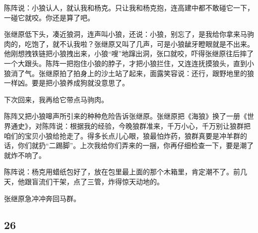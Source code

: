 \par 陈阵说：小狼认人，就认我和杨克。只让我和杨克抱，连高建中都不敢碰它一下，一碰它就咬。你还是算了吧。
\par 张继原低下头，凑近狼洞，连声叫小狼，还说：小狼，别忘了，是我给你拿来马驹肉的，吃饱了，就不认我啦？张继原又叫了几声，可是小狼龇牙瞪眼就是不出来。他刚想拽铁链把小狼拽出来，小狼“嗖”地蹿出洞，张口就咬，吓得张继原往后摔了一个大跟头。陈阵一把抱住小狼的脖子，才把小狼拦住，又连连抚摸狼头，直到小狼消了气。张继原拍了拍身上的沙土站了起来，面露笑容说：还行，跟野地里的狼一样凶。要是把小狼养成狗就没意思了。
\par 下次回来，我再给它带点马驹肉。
\par 陈阵又把小狼嗥声所引来的种种危险告诉张继原。张继原把《海狼》换了一册《世界通史》，对陈阵说：根据我的经验，今晚狼群准来，千万小心，千万别让狼群把咱们的宝贝小狼给抢走了。得多长点儿心眼，狼最怕炸药，狼群真要是冲羊群的话，你们就扔“二踢脚”。上次我给你们弄来的一捆，你再仔细检查一下，要是潮了就炸不响了。
\par 陈阵说：杨克用蜡纸包好了，放在包里最上面的那个木箱里，肯定潮不了。前几天，他跟盲流们干架，点了三管，炸得惊天动地的。
\par 张继原急冲冲奔回马群。





\subsection*{26}



